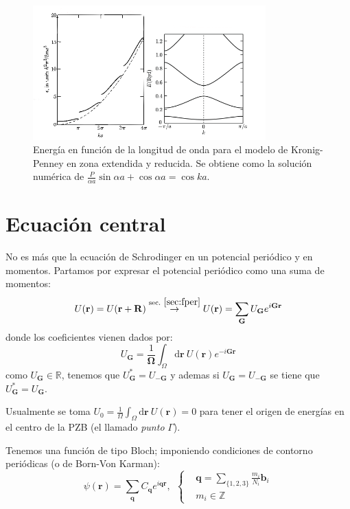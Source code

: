 \begin{figure}
  \centering
  \includegraphics[width=0.8\textwidth]{figures/fullsolve.png}
  \caption{Energía en función de la longitud de onda para el modelo de
    Kronig-Penney en zona extendida y reducida. Se obtiene como la
    solución numérica de
    $ \frac{P}{\alpha a} \sin \alpha a + \cos \alpha a = \cos ka$.}
  \label{fig:fullsolve}
\end{figure}



\section{Ecuación central}
No es más que la ecuación de Schrodinger en un potencial periódico y
en momentos. Partamos por expresar el potencial periódico como una
suma de momentos:
\begin{equation}
  U(\mathbf{r}) = U(\mathbf{r}+\mathbf{R}) \stackrel{ \text{sec.}\
    \ref{sec:fper}}{\ \rightarrow \ } U(\mathbf{r}) =
  \sum_{\mathbf{G}} U_\mathbf{G} e^{i \mathbf{G}\mathbf{r}}
\end{equation}
donde los coeficientes vienen dados por:
\begin{equation}
  U_\mathbf{G} = \frac{1}{\boldsymbol{\Omega}} \int_\Omega
  \text{d}\mathbf{r}\ U(\mathbf{r}) e^{-i \mathbf{G} \mathbf{r}}
\end{equation}
como $U_\mathbf{G} \in \mathbb R$, tenemos que $U_\mathbf{G}^* =
U_\mathbf{-G}$ y ademas si $U_\mathbf{G}=U_\mathbf{-G}$ se tiene que
$U_\mathbf{G}^* = U_\mathbf{G}$.

Usualmente se toma $U_0 = \frac{1}{\Omega} \int_\Omega
\text{d}\mathbf{r} \ U(\mathbf{r}) = 0$ para tener el origen de
energías en el centro de la PZB (el llamado \emph{punto} $\Gamma$).

Tenemos una función de tipo Bloch; imponiendo condiciones de contorno
periódicas (o de Born-Von Karman):
\begin{equation}
  \psi(\mathbf{r}) = \sum_{\mathbf{q}} C_\mathbf{q} e^{i \mathbf{q}
    \mathbf{r}}, \ \
  \begin{cases}
    &\mathbf{q} = \sum_{\{1,2,3\}}\frac{m_i}{N_i} \mathbf{b}_i \\
    &m_i \in \mathbb Z
  \end{cases}
\end{equation}

